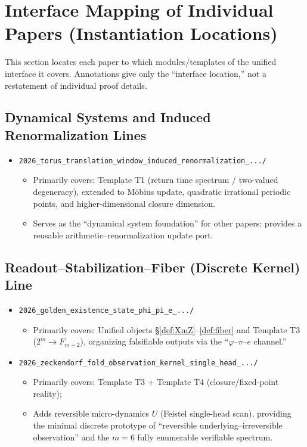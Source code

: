 \section{Interface Mapping of Individual Papers (Instantiation Locations)}

This section locates each paper to which modules/templates of the unified interface it covers. Annotations give only the ``interface location,'' not a restatement of individual proof details.

\subsection{Dynamical Systems and Induced Renormalization Lines}

\begin{itemize}
  \item \texttt{2026\_torus\_translation\_window\_induced\_renormalization\_.../}
  \begin{itemize}
    \item Primarily covers: Template T1 (return time spectrum / two-valued degeneracy), extended to Möbius update, quadratic irrational periodic points, and higher-dimensional closure dimension.
    \item Serves as the ``dynamical system foundation'' for other papers: provides a reusable arithmetic--renormalization update port.
  \end{itemize}
\end{itemize}

\subsection{Readout--Stabilization--Fiber (Discrete Kernel) Line}

\begin{itemize}
  \item \texttt{2026\_golden\_existence\_state\_phi\_pi\_e\_.../}
  \begin{itemize}
    \item Primarily covers: Unified objects \S\ref{def:XmZ}--\ref{def:fiber} and Template T3 ($2^m\to F_{m+2}$), organizing falsifiable outputs via the ``$\varphi$--$\pi$--$e$ channel.''
  \end{itemize}

  \item \texttt{2026\_zeckendorf\_fold\_observation\_kernel\_single\_head\_.../}
  \begin{itemize}
    \item Primarily covers: Template T3 + Template T4 (closure/fixed-point reality);
    \item Adds reversible micro-dynamics $U$ (Feistel single-head scan), providing the minimal discrete prototype of ``reversible underlying--irreversible observation'' and the $m=6$ fully enumerable verifiable spectrum.
  \end{itemize}
\end{itemize}

